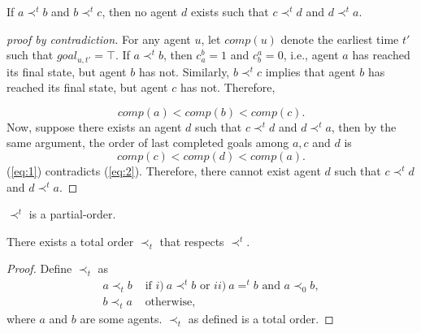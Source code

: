 
\begin{prop}
If $a \prec^t b$ and $b \prec^t c$, then no agent $d$ exists such that $c \prec^t d$ and $d \prec^t a$.
\end{prop}
\begin{proof}[proof by contradiction]
For any agent $u$, let $comp(u)$ denote the earliest time $t'$ such that $goal_{u,t'} = \top$.
If $a \prec^t b$, then $c^b_a = 1$ and $c_b^a = 0$, i.e., agent $a$ has reached its final state, but agent $b$ has not.  Similarly, $b \prec^t c$ implies that agent $b$ has reached its final state, but agent $c$ has not. Therefore, 

\begin{equation}
\label{eq:1}
comp(a) < comp(b) < comp(c).
\end{equation}
Now, suppose there exists an agent $d$ such that $c \prec^t d$ and $d \prec^t a$, then by the same argument, the order of last completed goals among $a,c$ and $d$ is 
\begin{equation}
\label{eq:2}
    comp(c) < comp(d) < comp(a).
\end{equation}
(\ref{eq:1}) contradicts (\ref{eq:2}). Therefore, there cannot exist agent $d$ such that $c \prec^t d$ and $d \prec^t a$. %
\end{proof}

\begin{cor}
$\prec^t$ is a partial-order.
\end{cor}

\begin{prop}
There exists a total order $\prec_t$ that respects $\prec^t$.
\end{prop}
\begin{proof}
Define $\prec_t$ as 
\begin{align}
    a \prec_t b &\text{ if }
                    i)~a \prec^t b \text{ or }
                    ii)~a =^t b \text{ and } a \prec_0 b, \\
    b \prec_t a &\text{ otherwise,}      \nonumber          
\end{align}
\noindent where $a$ and $b$ are some agents.
$\prec_t$ as defined is a total order. %
\end{proof}

